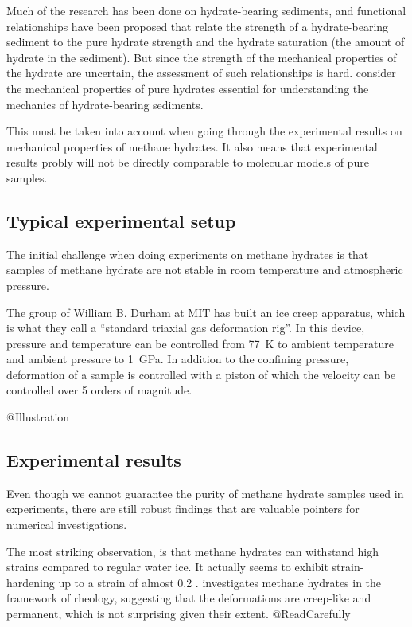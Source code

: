 Much of the research has been done on hydrate-bearing sediments, and functional relationships have been proposed that relate the strength of a hydrate-bearing sediment to the pure hydrate strength and the hydrate saturation (the amount of hydrate in the sediment). But since the strength of the mechanical properties of the hydrate are uncertain, the assessment of such relationships is hard. \citet{Ning2012} consider the mechanical properties of pure hydrates essential for understanding the mechanics of hydrate-bearing sediments.

This must be taken into account when going through the experimental results on mechanical properties of methane hydrates. It also means that experimental results probly will not be directly comparable to molecular models of pure samples.

\subsection{Typical experimental setup}
The initial challenge when doing experiments on methane hydrates is that samples of methane hydrate are not stable in room temperature and atmospheric pressure.

The group of William B. Durham at MIT has built an ice creep apparatus, which is what they call a ``standard triaxial gas deformation rig''. In this device, pressure and temperature can be controlled from \SI{77}{\kelvin} to ambient temperature and ambient pressure to \SI{1}{\giga\pascal}. In addition to the confining pressure, deformation of a sample is controlled with a piston of which the velocity can be controlled over 5 orders of magnitude.

@Illustration

\subsection{Experimental results}
Even though we cannot guarantee the purity of methane hydrate samples used in experiments, there are still robust findings that are valuable pointers for numerical investigations. 

The most striking observation, is that methane hydrates can withstand high strains compared to regular water ice. It actually seems to exhibit strain-hardening up to a strain of almost 0.2 \cite{Durham2003, Stern1998}. \cite{Durham2003} investigates methane hydrates in the framework of rheology, suggesting that the deformations are creep-like and permanent, which is not surprising given their extent. @ReadCarefully 

